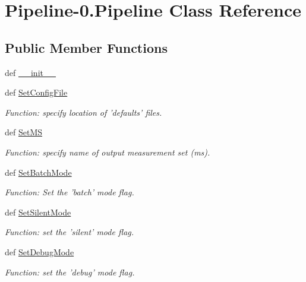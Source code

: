 \hypertarget{class_pipeline-0_1_1_pipeline}{\section{\-Pipeline-\/0.\-Pipeline \-Class \-Reference}
\label{class_pipeline-0_1_1_pipeline}
}
\subsection*{\-Public \-Member \-Functions}
\begin{DoxyCompactItemize}
\item 
def \hyperlink{class_pipeline-0_1_1_pipeline_a5447de828ea69f6a94c785f4a3a0287f}{\-\_\-\-\_\-init\-\_\-\-\_\-}
\item 
def \hyperlink{class_pipeline-0_1_1_pipeline_a86d71d9abde9c0d192a56ad1642a9881}{\-Set\-Config\-File}
\begin{DoxyCompactList}\small\item\em \-Function\-: specify location of 'defaults' files. \end{DoxyCompactList}\item 
def \hyperlink{class_pipeline-0_1_1_pipeline_afe70379ec45cebe981d2ebab7d988729}{\-Set\-M\-S}
\begin{DoxyCompactList}\small\item\em \-Function\-: specify name of output measurement set (ms). \end{DoxyCompactList}\item 
def \hyperlink{class_pipeline-0_1_1_pipeline_a4d55d3e62c94a121a6472b38e2772d2b}{\-Set\-Batch\-Mode}
\begin{DoxyCompactList}\small\item\em \-Function\-: \-Set the 'batch' mode flag. \end{DoxyCompactList}\item 
def \hyperlink{class_pipeline-0_1_1_pipeline_a9c1c6502545b1d3531ec7d291cb18586}{\-Set\-Silent\-Mode}
\begin{DoxyCompactList}\small\item\em \-Function\-: set the 'silent' mode flag. \end{DoxyCompactList}\item 
def \hyperlink{class_pipeline-0_1_1_pipeline_ac8f6ada88a526bc7b060e1163748c94d}{\-Set\-Debug\-Mode}
\begin{DoxyCompactList}\small\item\em \-Function\-: set the 'debug' mode flag. \end{DoxyCompactList}\item 

\end{DoxyCompactItemize}
